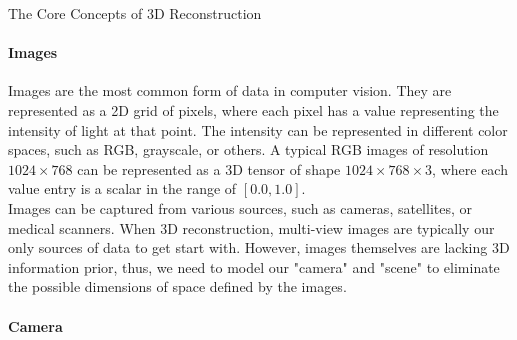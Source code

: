 The Core Concepts of 3D Reconstruction

\paragraph{Images}

Images are the most common form of data in 
computer vision. They are represented as a 2D grid 
of pixels, where each pixel has a value 
representing the intensity of light at that point. 
The intensity can be represented in 
different color spaces, such as RGB, 
grayscale, or others. A typical RGB images of resolution $1024\times 768$
can be represented as a 3D tensor of shape $1024\times 768\times 3$, where 
each value entry is a scalar in the range of $[0.0, 1.0]$.
\\

Images can be captured from various sources, 
such as cameras, satellites, or medical scanners.
When 3D reconstruction, multi-view images are typically 
our only sources of data to get start with. 
However, images themselves are lacking 3D information prior,
thus, we need to model our "camera" and "scene" to eliminate
the possible dimensions of space defined by the images.

\paragraph{Camera}

